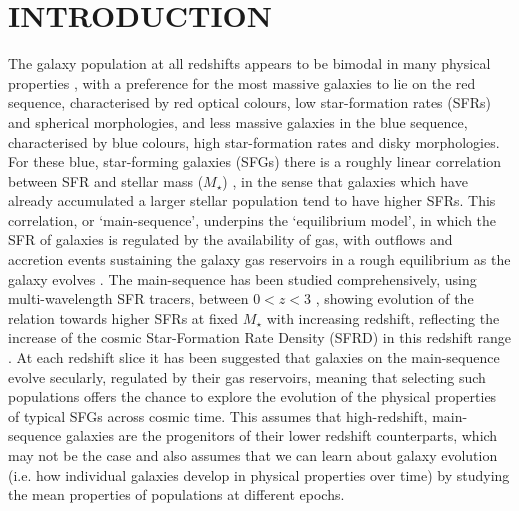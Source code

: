 \documentclass[fleqn,usenatbib]{mnras}
\begin{document}
\section{INTRODUCTION}

The galaxy population at all redshifts appears to be bimodal in many physical properties \citep[e.g. as described in][]{Dekel2006}, with a preference for the most massive galaxies to lie on the red sequence, characterised by red optical colours, low star-formation rates (SFRs) and spherical morphologies, and less massive galaxies in the blue sequence, characterised by blue colours, high star-formation rates and disky morphologies. 
For these blue, star-forming galaxies (SFGs) there is a roughly linear correlation between SFR and stellar mass ($M_{\star}$) \citep[e.g.][]{Daddi2007,Noeske2007,Elbaz2007}, in the sense that galaxies which have already accumulated a larger stellar population tend to have higher SFRs.
This correlation, or `main-sequence', underpins the `equilibrium model', in which the SFR of galaxies is regulated by the availability of gas, with outflows and accretion events sustaining the galaxy gas reservoirs in a rough equilibrium as the galaxy evolves \citep[e.g.][]{Dave2012,Lilly2013,Saintonge2013}.
The main-sequence has been studied comprehensively, using multi-wavelength SFR tracers, between $0 < z < 3$ \citep[e.g.][]{Rodighiero2011,Karim2011,Whitaker2012,Behroozi2013b,Whitaker2014,Rodighiero2014,Speagle2014,Pannella2014,Sobral2014,Sparre2015,Lee2015,Schreiber2015,Renzini2015,Nelson2016}, showing evolution of the relation towards higher SFRs at fixed $M_{\star}$ with increasing redshift, reflecting the increase of the cosmic Star-Formation Rate Density (SFRD) in this redshift range \citep[e.g.][]{Madau_2014,Khostovan2015}.
At each redshift slice it has been suggested that galaxies on the main-sequence evolve secularly, regulated by their gas reservoirs, meaning that selecting such populations offers the chance to explore the evolution of the physical properties of typical SFGs across cosmic time.
This assumes that high-redshift, main-sequence galaxies are the progenitors of their lower redshift counterparts, which may not be the case \citep[e.g.][]{Gladders2013,Kelson2014,Abramson2016b} and also assumes that we can learn about galaxy evolution (i.e. how individual galaxies develop in physical properties over time) by studying the mean properties of populations at different epochs. 
\end{document}
